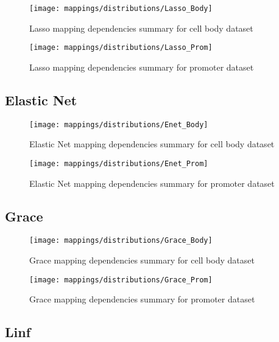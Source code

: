 \begin{figure}[H]
	\centering
	\texttt{[image: mappings/distributions/Lasso\_Body]}
	\caption{Lasso mapping dependencies summary for cell body dataset}
	\label{fig:map_body_lasso}
\end{figure}

\begin{figure}[H]
	\centering
	\texttt{[image: mappings/distributions/Lasso\_Prom]}
	\caption{Lasso mapping dependencies summary for promoter dataset}
	\label{fig:map_prom_lasso}
\end{figure}


\pagebreak
\subsection{Elastic Net}

\begin{figure}[H]
	\centering
	\texttt{[image: mappings/distributions/Enet\_Body]}
	\caption{Elastic Net mapping dependencies summary for cell body dataset}
	\label{fig:map_body_enet}
\end{figure}

\begin{figure}[H]
	\centering
	\texttt{[image: mappings/distributions/Enet\_Prom]}
	\caption{Elastic Net mapping dependencies summary for promoter dataset}
	\label{fig:map_prom_enet}
\end{figure}


\pagebreak
\subsection{Grace}

\begin{figure}[H]
	\centering
	\texttt{[image: mappings/distributions/Grace\_Body]}
	\caption{Grace mapping dependencies summary for cell body dataset}
	\label{fig:map_body_grace}
\end{figure}

\begin{figure}[H]
	\centering
	\texttt{[image: mappings/distributions/Grace\_Prom]}
	\caption{Grace mapping dependencies summary for promoter dataset}
	\label{fig:map_prom_grace}
\end{figure}


\pagebreak
\subsection{Linf}


